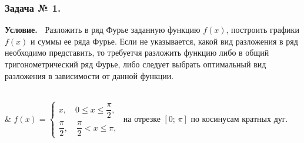 \subsubsection*{\center Задача № 1.}
{\bf Условие.~}
Разложить в ряд Фурье заданную функцию $f(x)$, построить графики $f(x)$ и суммы ее ряда Фурье. Если не указывается, какой вид разложения в ряд необходимо представить, то требуетчя разложить функцию либо в общий тригонометрический ряд Фурье, либо следует выбрать оптимальный вид разложения в зависимости от данной функции.


\\  &
	$
	f(x)=\left\{
	\begin{array}{r}
	x, \quad0 \leq x \leq \dfrac{\pi}{2}, \\
	\dfrac{\pi}{2}, \quad\dfrac{\pi}{2}<x \leq \pi,
	\end{array}
	\right.
	$
	на отрезке $[0;\,\pi]$ по косинусам кратных дуг.

